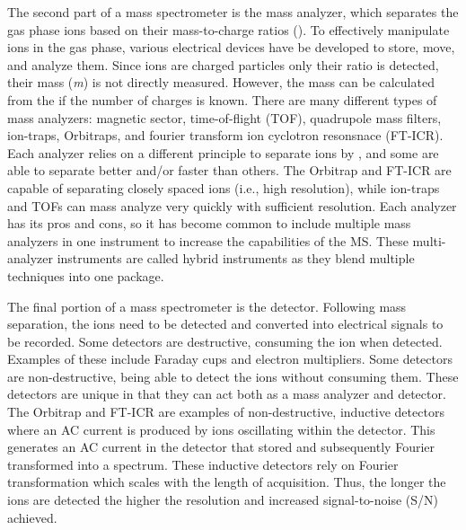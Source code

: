 The second part of a mass spectrometer is the mass analyzer, which separates the gas phase ions based on their mass-to-charge ratios (\mz{}). To effectively manipulate ions in the gas phase, various electrical devices have be developed to store, move, and analyze them. Since ions are charged particles only their \mz{} ratio is detected, their mass (\emph{m}) is not directly measured. However, the mass can be calculated from the \mz{} if the number of charges is known. There are many different types of mass analyzers: magnetic sector, time-of-flight (TOF)\cite{tof}, quadrupole mass filters\cite{iontrap}, ion-traps\cite{iontrap2}, Orbitraps\cite{orbitrap}, and fourier transform ion cyclotron resonsnace (FT-ICR)\cite{fticr}. Each analyzer relies on a different principle to separate ions by \mz{}, and some are able to separate better and/or faster than others. The Orbitrap and FT-ICR are capable of separating closely spaced \mz{} ions (i.e., high resolution), while ion-traps and TOFs can mass analyze very quickly with sufficient resolution. Each analyzer has its pros and cons, so it has become common to include multiple mass analyzers in one instrument to increase the capabilities of the MS. These multi-analyzer instruments are called hybrid instruments as they blend multiple techniques into one package.

The final portion of a mass spectrometer is the detector. Following mass separation, the ions need to be detected and converted into electrical signals to be recorded. Some detectors are destructive, consuming the ion when detected. Examples of these include Faraday cups and electron multipliers. Some detectors are non-destructive, being able to detect the ions without consuming them. These detectors are unique in that they can act both as a mass analyzer and detector. The Orbitrap and FT-ICR are examples of non-destructive, inductive detectors where an AC current is produced by ions oscillating within the detector. This generates an AC current in the detector that stored and subsequently Fourier transformed into a \mz{} spectrum. These inductive detectors rely on Fourier transformation which scales with the length of acquisition. Thus, the longer the ions are detected the higher the resolution and increased signal-to-noise (S/N) achieved.

